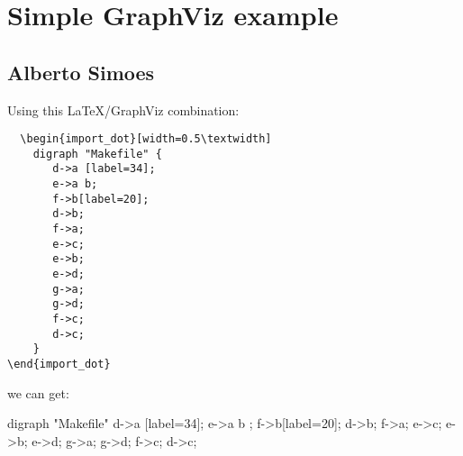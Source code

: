 \documentclass[a4paper]{article}
\begin{document}
\section*{Simple GraphViz example}
\subsection*{Alberto Simoes}

Using this \LaTeX/GraphViz combination:
\begin{verbatim}
  \begin{import_dot}[width=0.5\textwidth]
    digraph "Makefile" {
       d->a [label=34];
       e->a b;
       f->b[label=20];
       d->b;
       f->a;
       e->c;
       e->b;
       e->d;
       g->a;
       g->d;
       f->c;
       d->c;
    }
\end{import_dot}
\end{verbatim}
we can get:
\begin{import_dot}[width=0.5\textwidth]
digraph "Makefile" {
d->a [label=34];
e->a b ;
f->b[label=20];
d->b;
f->a;
e->c;
e->b;
e->d;
g->a;
g->d;
f->c;
d->c;
}
\end{import_dot}
\end{document}
